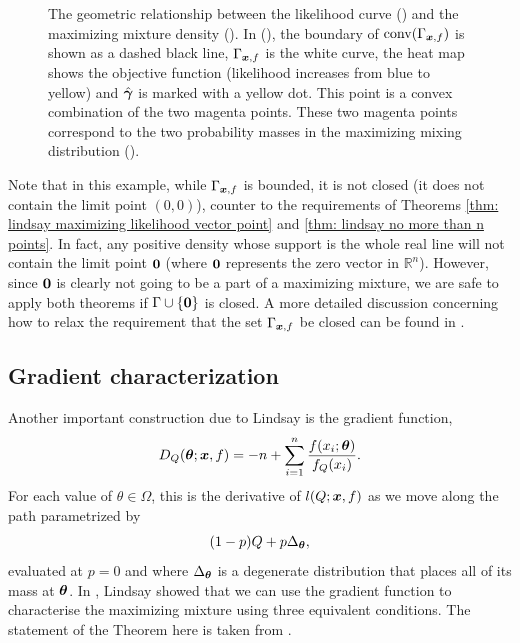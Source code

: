 \begin{figure}[ht]
			\caption[The geometric relationship between the likelihood curve () and the maximizing mixture density ().]{The geometric relationship between the likelihood curve () and the maximizing mixture density (). In (), the boundary of $\mathrm{conv}(\Gamma_{{\bm{{x}}}, f})$ is shown as a dashed black line, $\Gamma_{{\bm{{x}}}, f}$ is the white curve, the heat map  shows the objective function (likelihood increases from blue to yellow) and $\hat{{\bm{{\gamma}}}}$ is marked with a yellow dot. This point is a convex combination of the two magenta points. These two magenta points correspond to the two probability masses in the maximizing mixing distribution ().}
			\label{fig:GammaSol}
		\end{figure}

		\begin{remark}
			Note that in this example, while $\Gamma_{{\bm{{x}}}, f}$ is bounded, it is not closed (it does not contain the limit point $(0,0)$), counter to the requirements of Theorems \ref{thm: lindsay maximizing likelihood vector point} and \ref{thm: lindsay no more than n points}. In fact, any positive density whose support is the whole real line will not contain the limit point ${\bm{{0}}}$ (where ${\bm{{0}}}$ represents the zero vector in $\mathbb{R}^n$). However, since ${\bm{{0}}}$ is clearly not going to be a part of a maximizing mixture, we are safe to apply both theorems if $\Gamma \cup \{ {\bm{{0}}} \}$ is closed. A more detailed discussion concerning how to relax the requirement that the set $\Gamma_{{\bm{{x}}},f}$ be closed can be found in \cite[Section 5.2.2.]{Lindsay1995-sq}.
		\end{remark}

	\subsection{Gradient characterization}
	\label{sec: gradient characterization}
	Another important construction due to Lindsay is the gradient function,
	\begin{equation}
		D_Q({\bm{{\theta}}}; {\bm{{x}}}, f) = -n + \sum_{i = 1}^n \frac{f(x_i;{\bm{{\theta}}})}{f_Q(x_i)}.
		\label{eq:def gradient function}
	\end{equation}
	For each value of $\theta \in \Omega$, this is the derivative of $l(Q;{\bm{{x}}},f)$ as we move along the path parametrized by
	\begin{equation}
		(1 - p)Q + p\Delta_{\bm{{\theta}}},
	\end{equation}
	evaluated at $p = 0$ and where $\Delta_{\bm{{\theta}}}$ is a degenerate distribution that places all of its mass at ${\bm{{\theta}}}$. In \cite[Theorem 4.1]{Lindsay1983-tf}, Lindsay showed that we can use the gradient function to characterise the maximizing mixture using three equivalent conditions. The statement of the Theorem here is taken from \cite[Theorem 19]{Lindsay1995-sq}.

